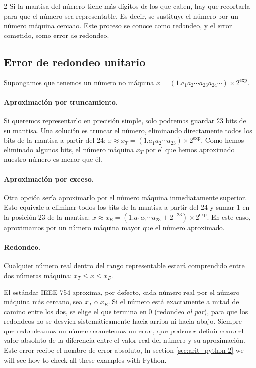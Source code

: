 \begin{paracol}{2}
Si la mantisa del número tiene más dígitos de los que caben, hay que recortarla para que el número sea representable. Es decir, se sustituye el número por un número máquina cercano. Este proceso se conoce como redondeo, y el error cometido, como error de redondeo.

\subsection{Error de redondeo unitario} 
Supongamos que tenemos un número no máquina $x=(1.a_1a_2\cdots a_{23}a_{24}\cdots)\times2^{\text{exp}}$.

\paragraph{Aproximación por truncamiento.} Si queremos representarlo en precisión simple, solo podremos guardar 23 bits de su mantisa. Una solución es truncar el número, eliminando directamente todos los bits de la mantisa a partir del 24: $x\approx x_T= (1.a_1a_2\cdots a_{23})\times2^{\text{exp}}$. Como hemos eliminado algunos bits, el número máquina $x_T$ por el que hemos aproximado nuestro número es menor que él.

\paragraph{Aproximación por exceso.}  Otra opción sería aproximarlo por el número máquina inmediatamente superior. Esto equivale a eliminar todos los bits de la mantisa a partir del 24 y sumar 1 en la posición 23 de la mantisa: $x\approx x_E=  (1.a_1a_2\cdots a_{23}+2^{-23})\times2^{\text{exp}}$. En este caso, aproximamos por un número máquina mayor que el número aproximado.

\paragraph{Redondeo.} Cualquier número real dentro del rango representable estará comprendido entre dos números máquina: $x_T\leq x\leq x_E$.

El estándar IEEE 754 aproxima, por defecto, cada número real por el número máquina más cercano, sea $x_T$ o $x_E$. Si el número está exactamente a mitad de camino entre los dos, se elige el que termina en 0 (redondeo \emph{al par}), para que los redondeos no se desvíen sistemáticamente hacia arriba ni hacia abajo.
Siempre que redondeamos un número cometemos un error, que podemos definir como el valor absoluto de la diferencia entre el valor real del número y su aproximación. Este error recibe el nombre de error absoluto,
\switchcolumn
In section \ref{sec:arit_python-2} we will see how to check all these examples with Python.


\end{paracol}
